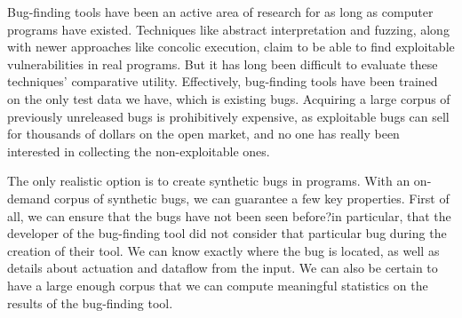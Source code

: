 Bug-finding tools have been an active area of research for as long as computer programs have existed. Techniques like abstract interpretation and fuzzing, along with newer approaches like concolic execution, claim to be able to find exploitable vulnerabilities in real programs.  But it has long been difficult to evaluate these techniques' comparative utility. Effectively, bug-finding tools have been trained on the only test data we have, which is existing bugs. Acquiring a large corpus of previously unreleased bugs is prohibitively expensive, as exploitable bugs can sell for thousands of dollars on the open market, and no one has really been interested in collecting the non-exploitable ones.

The only realistic option is to create synthetic bugs in programs.
With an on-demand corpus of synthetic bugs, we can guarantee a few key properties.
First of all, we can ensure that the bugs have not been seen before?in particular, that the developer of the bug-finding tool did not consider that particular bug during the creation of their tool.
We can know exactly where the bug is located, as well as details about actuation and dataflow from the input.
We can also be certain to have a large enough corpus that we can compute meaningful statistics on the results of the bug-finding tool.